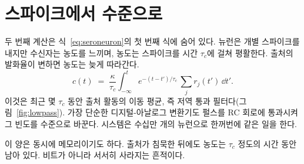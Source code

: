 \section{스파이크에서 수준으로}

두 번째 계산은 식~\eqref{eq:seroneuron}의 첫 번째 식에 숨어 있다. 뉴런은 개별 스파이크를 내지만 수신자는 농도를 느끼며, 농도는 스파이크를 시간 $\tau_c$에 걸쳐 평활한다. 출처의 발화율이 변하면 농도는 늦게 따라간다.
\begin{equation}
c(t) \;=\; \frac{\kappa}{\tau_c}\int_{-\infty}^{t} e^{-(t-t')/\tau_c}\,\sum_j r_j(t')\,\dd t' .
\label{eq:lowpass}
\end{equation}
이것은 최근 몇 $\tau_c$ 동안 출처 활동의 이동 평균, 즉 저역 통과 필터다(그림~\ref{fig:lowpass}). 가장 단순한 디지털-아날로그 변환기도 펄스를 RC 회로에 통과시켜 그 빈도를 수준으로 바꾼다.  시스템은 수십만 개의 뉴런으로 한꺼번에 같은 일을 한다.

이 양은 동시에 메모리이기도 하다. 출처가 침묵한 뒤에도 농도는 $\tau_c$ 정도의 시간 동안 남아 있다. 비트가 아니라 서서히 사라지는 흔적이다.

